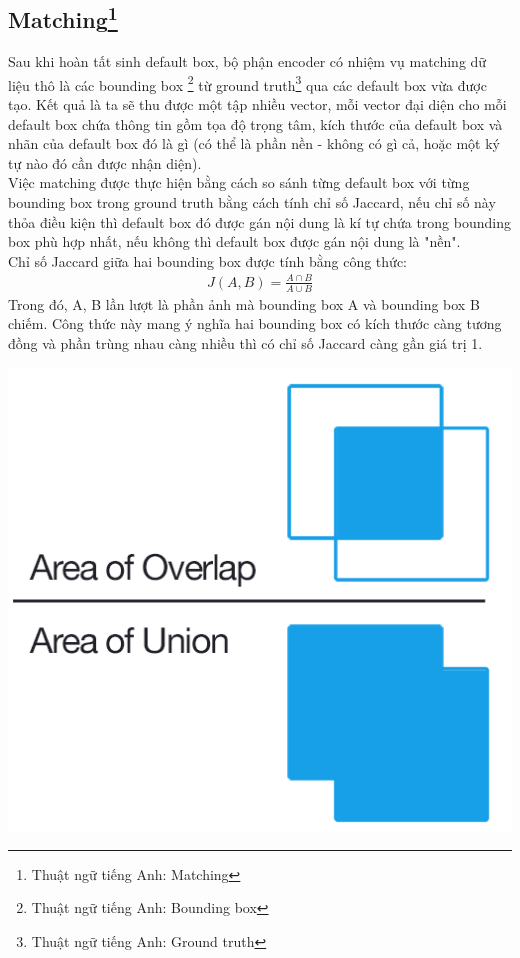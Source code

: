 \documentclass[a4paper,12pt]{article}
\begin{document}
	\subsection*{Matching\footnote{Thuật ngữ tiếng Anh: Matching}}
	
	Sau khi hoàn tất sinh default box, bộ phận encoder có nhiệm vụ matching dữ liệu thô là các bounding box \footnote{Thuật ngữ tiếng Anh: Bounding box} từ ground truth\footnote{Thuật ngữ tiếng Anh: Ground truth} qua các default box vừa được tạo. Kết quả là ta sẽ thu được một tập nhiều vector, mỗi vector đại diện cho mỗi default box chứa thông tin gồm tọa độ trọng tâm, kích thước của default box và nhãn của default box đó là gì (có thể là phần nền - không có gì cả, hoặc một ký tự nào đó cần được nhận diện). \\
	
	Việc matching được thực hiện bằng cách so sánh từng default box với từng bounding box trong ground truth bằng cách tính chỉ số Jaccard\cite{Jaccard}, nếu chỉ số này thỏa điều kiện thì default box đó được gán nội dung là kí tự chứa trong bounding box phù hợp nhất, nếu không thì default box được gán nội dung là "nền".\\
	
	Chỉ số Jaccard\cite{Jaccard} giữa hai bounding box được tính bằng công thức:
	\begin{align}
	J(A, B) = \frac{A \cap B }{ A \cup B }
	\end{align}
	Trong đó, A, B lần lượt là phần ảnh mà bounding box A và bounding box B chiếm. Công thức này mang ý nghĩa hai bounding box có kích thước càng tương đồng và phần trùng nhau càng nhiều thì có chỉ số Jaccard\cite{Jaccard} càng gần giá trị 1.\\
	
	\begin{center}
		\centering
		\includegraphics[width=0.5\linewidth]{Intersection_over_Union_-_visual_equation.png}
		\vspace{0.5cm}
	\end{center}
	
\end{document}
